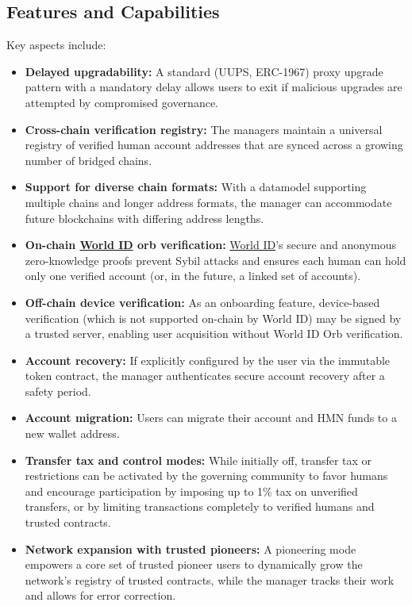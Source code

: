 \documentclass[12pt,a4paper]{article}
\begin{document}
\subsection{Features and Capabilities}
Key aspects include:
\begin{itemize}
    \item \textbf{Delayed upgradability:} A standard (UUPS, ERC-1967) proxy upgrade pattern with a mandatory delay allows users to exit if malicious upgrades are attempted by compromised governance.
    \item \textbf{Cross-chain verification registry:} The managers maintain a universal registry of verified human account addresses that are synced across a growing number of bridged chains.
    \item \textbf{Support for diverse chain formats:} With a datamodel supporting multiple chains and longer address formats, the manager can accommodate future blockchains with differing address lengths.
    \item \textbf{On-chain \href{https://world.org/world-id}{World ID} orb verification:} \href{https://world.org/world-id}{World ID}'s secure and anonymous zero-knowledge proofs prevent Sybil attacks and ensures each human can hold only one verified account (or, in the future, a linked set of accounts).
    \item \textbf{Off-chain device verification:} As an onboarding feature, device-based verification (which is not supported on-chain by World ID) may be signed by a trusted server, enabling user acquisition without World ID Orb verification.
    \item \textbf{Account recovery:} If explicitly configured by the user via the immutable token contract, the manager authenticates secure account recovery after a safety period.
    \item \textbf{Account migration:} Users can migrate their account and HMN funds to a new wallet address.
    \item \textbf{Transfer tax and control modes:} While initially off, transfer tax or restrictions can be activated by the governing community to favor humans and encourage participation by imposing up to 1\% tax on unverified transfers, or by limiting transactions completely to verified humans and trusted contracts.
    \item \textbf{Network expansion with trusted pioneers:} A pioneering mode empowers a core set of trusted pioneer users to dynamically grow the network's registry of trusted contracts, while the manager tracks their work and allows for error correction.

\end{itemize}
\end{document}
